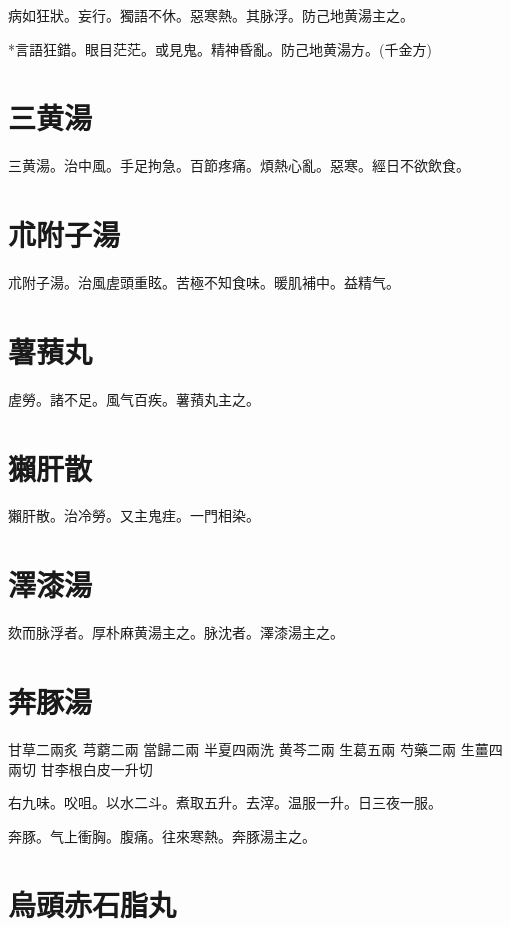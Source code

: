 \documentclass[b5paper,twoside,zihao=-4,UTF8]{ctexbook}
\begin{document}
病如狂狀。妄行。獨語不休。惡寒熱。其脉浮。防己地黄湯主之。

*言語狂錯。眼目茫茫。或見鬼。精神昏亂。防己地黄湯方。(千金方)

\section{三黄湯}

三黄湯。治中風。手足拘急。百節疼痛。煩熱心亂。惡寒。經日不欲飲食。

\section{朮附子湯}

朮附子湯。治風虗頭重眩。苦極不知食味。暖肌補中。益精气。

\section{薯蕷丸}

虗勞。諸不足。風气百疾。薯蕷丸主之。

\section{獺肝散}

獺肝散。治冷勞。又主鬼疰。一門相染。

\section{澤漆湯}

欬而脉浮者。厚朴麻黄湯主之。脉沈者。澤漆湯主之。

\section{奔豚湯}

甘草{\scriptsize 二兩{炙}} 芎藭{\scriptsize 二兩} 當歸{\scriptsize 二兩} 半夏{\scriptsize 四兩{洗}} 黄芩{\scriptsize 二兩} 生葛{\scriptsize 五兩} 芍藥{\scriptsize 二兩} 生薑{\scriptsize 四兩{切}} 甘李根白皮{\scriptsize 一升{切}}

右九味。{㕮咀。}以水二斗。煮取五升。{去滓。}温服一升。日三夜一服。

奔豚。气上衝胸。腹痛。往來寒熱。奔豚湯主之。

\section{烏頭赤石脂丸}
\end{document}
